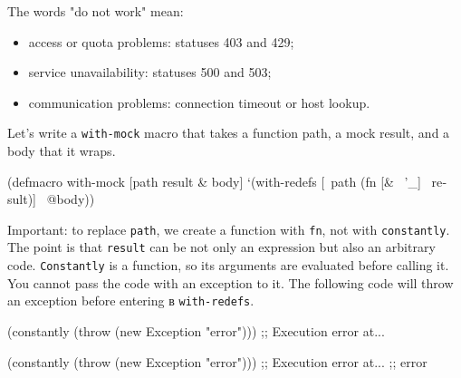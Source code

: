 The words "do not work" mean:


\begin{itemize}

\item
  access or quota problems: statuses 403 and 429;

\item
  service unavailability: statuses 500 and 503;

\item
  communication problems: connection timeout or host lookup.

\end{itemize}

Let's write a \verb|with-mock| macro that takes a function path, a mock result, and a body that it wraps.


\begin{english}
  \begin{clojure}
(defmacro with-mock
  [path result & body]
  `(with-redefs
     [~path (fn [& ~'_] ~result)]
     ~@body))
  \end{clojure}
\end{english}

Important: to replace \verb|path|, we create a function with \verb|fn|, not with \verb|constantly|. The point is that \verb|result| can be not only an expression but also an arbitrary code. \verb|Constantly| is a function, so its arguments are evaluated before calling it. You cannot pass the code with an exception to it. The following code will throw an exception before entering в \verb|with-redefs|.

\ifx\DEVICETYPE\MOBILE

\begin{english}
  \begin{clojure}
(constantly
  (throw (new Exception "error")))
;; Execution error at...
  \end{clojure}
\end{english}

\else

\begin{english}
  \begin{clojure}
(constantly (throw (new Exception "error")))
;; Execution error at...
;; error
  \end{clojure}
\end{english}

\fi

